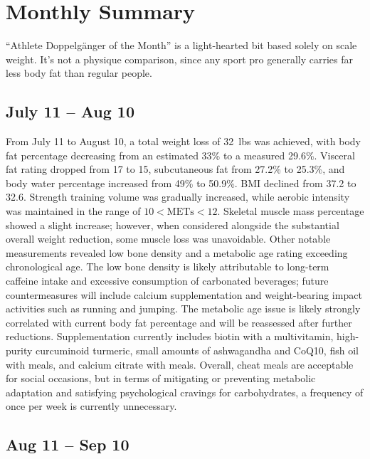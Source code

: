 \section{Monthly Summary}
\label{sec:Summary}
“Athlete Doppelgänger of the Month” is a light-hearted bit based solely on scale weight. It’s not a physique comparison, since any sport pro generally carries far less body fat than regular people.
\subsection{July 11 -- Aug 10}

From July 11 to August 10, a total weight loss of 32~lbs was achieved, with body fat percentage decreasing from an estimated 33\% to a measured 29.6\%. Visceral fat rating dropped from 17 to 15, subcutaneous fat from 27.2\% to 25.3\%, and body water percentage increased from 49\% to 50.9\%. BMI declined from 37.2 to 32.6. Strength training volume was gradually increased, while aerobic intensity was maintained in the range of $10 < \mathrm{METs} < 12$. Skeletal muscle mass percentage showed a slight increase; however, when considered alongside the substantial overall weight reduction, some muscle loss was unavoidable. Other notable measurements revealed low bone density and a metabolic age rating exceeding chronological age. The low bone density is likely attributable to long-term caffeine intake and excessive consumption of carbonated beverages; future countermeasures will include calcium supplementation and weight-bearing impact activities such as running and jumping. The metabolic age issue is likely strongly correlated with current body fat percentage and will be reassessed after further reductions. Supplementation currently includes biotin with a multivitamin, high-purity curcuminoid turmeric, small amounts of ashwagandha and CoQ10, fish oil with meals, and calcium citrate with meals. Overall, cheat meals are acceptable for social occasions, but in terms of mitigating or preventing metabolic adaptation and satisfying psychological cravings for carbohydrates, a frequency of once per week is currently unnecessary.


\subsection{Aug 11 -- Sep 10}

